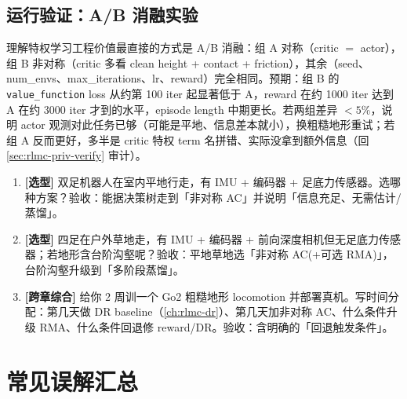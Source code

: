 \subsection{运行验证：A/B 消融实验}
\label{sec:rlmc-priv-ab}

理解特权学习工程价值最直接的方式是 A/B 消融：组 A 对称（critic $=$ actor），组 B 非对称（critic 多看 clean height + contact + friction），其余（seed、num\_envs、max\_iterations、lr、reward）完全相同。预期：组 B 的 \verb|value_function| loss 从约第 100 iter 起显著低于 A，reward 在约 1000 iter 达到 A 在约 3000 iter 才到的水平，episode length 中期更长。若两组差异 $<5\%$，说明 actor 观测对此任务已够（可能是平地、信息差本就小），换粗糙地形重试；若组 A 反而更好，多半是 critic 特权 term 名拼错、实际没拿到额外信息（回 \cref{sec:rlmc-priv-verify} 审计）。

\begin{practice}[本节练习]
\begin{enumerate}
  \item \textbf{[选型]} 双足机器人在室内平地行走，有 IMU + 编码器 + 足底力传感器。选哪种方案？验收：能据决策树走到「非对称 AC」并说明「信息充足、无需估计/蒸馏」。
  \item \textbf{[选型]} 四足在户外草地走，有 IMU + 编码器 + 前向深度相机但无足底力传感器；若地形含台阶沟壑呢？验收：平地草地选「非对称 AC(+可选 RMA)」，台阶沟壑升级到「多阶段蒸馏」。
  \item \textbf{[跨章综合]} 给你 2 周训一个 Go2 粗糙地形 locomotion 并部署真机。写时间分配：第几天做 DR baseline（\cref{ch:rlmc-dr}）、第几天加非对称 AC、什么条件升级 RMA、什么条件回退修 reward/DR。验收：含明确的「回退触发条件」。
\end{enumerate}
\end{practice}

\section*{常见误解汇总}
\label{sec:rlmc-priv-faq}

